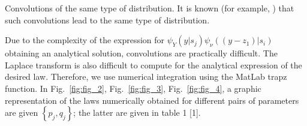 Convolutions of the same type of distribution. It is known (for example, \cite{bib_18}) that such convolutions lead to the same type of distribution. 

Due to the complexity of the expression for ${{\psi }_{Y}}(y|{{s}_{j}}){{\psi }_{\nu }}((y-{{z}_{1}})|{{s}_{i}})$ obtaining an analytical solution, convolutions are practically difficult. The Laplace transform is also difficult to compute for the analytical expression of the desired law. Therefore, we use numerical integration using the MatLab trapz function.
In Fig.~\ref{fig:fig_2}, Fig.~\ref{fig:fig_3}, Fig.~\ref{fig:fig_4}, a graphic representation of the laws numerically obtained for different pairs of parameters are given $\left\{ {{p}_{j}},{{q}_{j}} \right\}$; the latter are given in table 1 [1]. 



